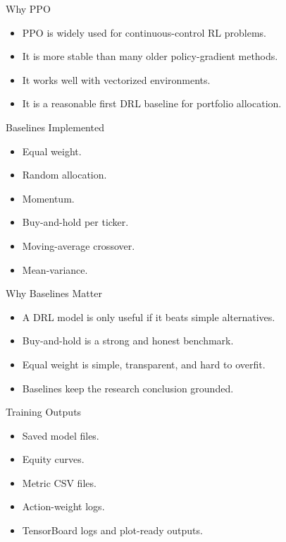 \documentclass[aspectratio=43,10pt]{beamer}
\begin{document}
\begin{frame}{Why PPO}
\begin{itemize}
  \item PPO is widely used for continuous-control RL problems.
  \item It is more stable than many older policy-gradient methods.
  \item It works well with vectorized environments.
  \item It is a reasonable first DRL baseline for portfolio allocation.
\end{itemize}
\end{frame}

\begin{frame}{Baselines Implemented}
\begin{itemize}
  \item Equal weight.
  \item Random allocation.
  \item Momentum.
  \item Buy-and-hold per ticker.
  \item Moving-average crossover.
  \item Mean-variance.
\end{itemize}
\end{frame}

\begin{frame}{Why Baselines Matter}
\begin{itemize}
  \item A DRL model is only useful if it beats simple alternatives.
  \item Buy-and-hold is a strong and honest benchmark.
  \item Equal weight is simple, transparent, and hard to overfit.
  \item Baselines keep the research conclusion grounded.
\end{itemize}
\end{frame}

\begin{frame}{Training Outputs}
\begin{itemize}
  \item Saved model files.
  \item Equity curves.
  \item Metric CSV files.
  \item Action-weight logs.
  \item TensorBoard logs and plot-ready outputs.
\end{itemize}
\end{frame}
\end{document}

